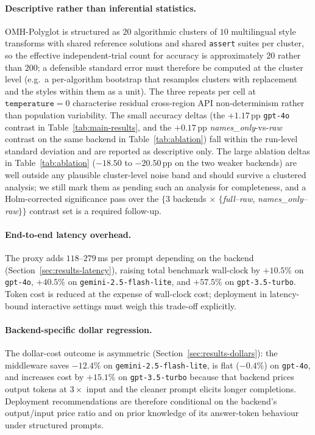 \documentclass[11pt,a4paper,twocolumn]{article}
\begin{document}
\paragraph{Descriptive rather than inferential statistics.} OMH-Polyglot is structured as $20$ algorithmic clusters of $10$ multilingual style transforms with shared reference solutions and shared \texttt{assert} suites per cluster, so the effective independent-trial count for accuracy is approximately $20$ rather than $200$; a defensible standard error must therefore be computed at the cluster level (e.g.\ a per-algorithm bootstrap that resamples clusters with replacement and the styles within them as a unit). The three repeats per cell at $\texttt{temperature}{=}0$ characterise residual cross-region API non-determinism rather than population variability. The small accuracy deltas (the $+1.17$\,pp \texttt{gpt-4o} contrast in Table~\ref{tab:main-results}, and the $+0.17$\,pp \textit{names\_only}-vs-\textit{raw} contrast on the same backend in Table~\ref{tab:ablation}) fall within the run-level standard deviation and are reported as descriptive only. The large ablation deltas in Table~\ref{tab:ablation} ($-18.50$ to $-20.50$\,pp on the two weaker backends) are well outside any plausible cluster-level noise band and should survive a clustered analysis; we still mark them as pending such an analysis for completeness, and a Holm-corrected significance pass over the $\{$3 backends $\times$ $\{$\textit{full}--\textit{raw}, \textit{names\_only}--\textit{raw}$\}\}$ contrast set is a required follow-up.

\paragraph{End-to-end latency overhead.} The proxy adds $118$--$279$\,ms per prompt depending on the backend (Section~\ref{sec:results-latency}), raising total benchmark wall-clock by $+10.5\%$ on \texttt{gpt-4o}, $+40.5\%$ on \texttt{gemini-2.5-flash-lite}, and $+57.5\%$ on \texttt{gpt-3.5-turbo}. Token cost is reduced at the expense of wall-clock cost; deployment in latency-bound interactive settings must weigh this trade-off explicitly.

\paragraph{Backend-specific dollar regression.} The dollar-cost outcome is asymmetric (Section~\ref{sec:results-dollars}): the middleware saves $-12.4\%$ on \texttt{gemini-2.5-flash-lite}, is flat ($-0.4\%$) on \texttt{gpt-4o}, and increases cost by $+15.1\%$ on \texttt{gpt-3.5-turbo} because that backend prices output tokens at $3\times$ input and the cleaner prompt elicits longer completions. Deployment recommendations are therefore conditional on the backend's output/input price ratio and on prior knowledge of its answer-token behaviour under structured prompts.
\end{document}
